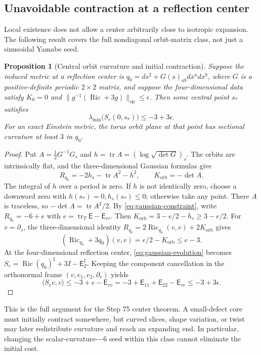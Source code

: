 \documentclass[a4paper,11pt]{article}
\numberwithin{equation}{section}
\newtheorem{proposition}[theorem]{Proposition}
\theoremstyle{definition}
\newcommand{\Ric}{\operatorname{Ric}}
\newcommand{\tr}{\operatorname{tr}}
\newcommand{\op}{\mathrm{op}}
\begin{document}
\subsection{Unavoidable contraction at a reflection center}
Local existence does not allow a center arbitrarily close to isotropic expansion.
The following result covers the full nondiagonal orbit-matrix class, not just a sinusoidal Yamabe seed.
\begin{proposition}[Central orbit curvature and initial contraction]\label{prop:center-contraction}
Suppose the induced metric at a reflection center is
$q_0=ds^2+G(s)_{ab}dx^adx^b$, where $G$ is a positive-definite periodic $2\times2$ matrix, and suppose the four-dimensional data satisfy $K_0=0$ and $\|g^{-1}(\Ric+3g)\|_\op\le\epsilon$.
Then some central point $s_*$ satisfies
\[
 \lambda_{\min}\bigl(S_r(0,s_*)\bigr)\le-3+3\epsilon.
\]
For an exact Einstein metric, the torus orbit plane at that point has sectional curvature at least $3$ in $q_0$.
\end{proposition}
\begin{proof}
Put $A=\frac12G^{-1}G_s$ and $h=\tr A=(\log\sqrt{\det G})_s$.
The orbits are intrinsically flat, and the three-dimensional Gaussian formulas give
 \begin{equation}\label{eq:center-slice-scalar}
 R_{q_0}=-2h_s-\tr A^2-h^2,\qquad
 K_{\mathrm{orb}}=-\det A.
 \end{equation}
The integral of $h$ over a period is zero. If $h$ is not identically zero, choose a downward zero with $h(s_*)=0,h_s(s_*)\le0$; otherwise take any point.
There $A$ is traceless, so $-\det A=\tr A^2/2$.
By \eqref{eq:gaussian-constraint}, write $R_{q_0}=-6+e$ with $e=\tr_T\mathsf E-\mathsf E_{rr}$. Then $K_{\mathrm{orb}}=3-e/2-h_s\ge3-e/2$.
For $v=\partial_s$, the three-dimensional identity
$R_{q_0}=2\Ric_{q_0}(v,v)+2K_{\mathrm{orb}}$ gives
\[
 (\Ric_{q_0}+3q_0)(v,v)=e/2-K_{\mathrm{orb}}\le e-3.
\]
At the four-dimensional reflection center, \eqref{eq:gaussian-evolution} becomes $S_r=\Ric(q_0)^\sharp+3I-\mathsf E_T^\sharp$.
Keeping the component cancellation in the orthonormal frame $(v,e_1,e_2,\partial_r)$ yields
\[
 \langle S_rv,v\rangle
 \le-3+e-\mathsf E_{vv}
 =-3+\mathsf E_{11}+\mathsf E_{22}-\mathsf E_{rr}
 \le-3+3\epsilon.
\]
\end{proof}
This is the full argument for the Step 75 center theorem. A small-defect core must initially contract somewhere, but curved slices, shape variation, or twist may later redistribute curvature and reach an expanding end.
In particular, changing the scalar-curvature-$-6$ seed within this class cannot eliminate the initial cost.
\end{document}

